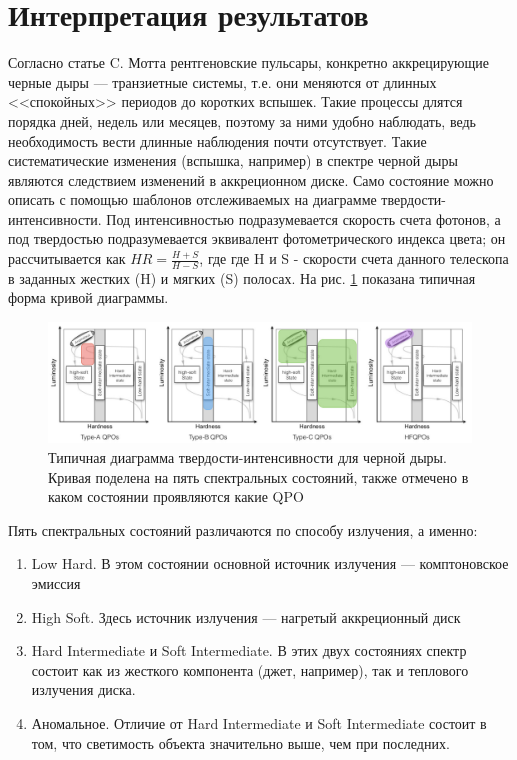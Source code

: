 \section{Интерпретация результатов}

	Согласно статье C. Мотта \cite{black_hole} рентгеновские пульсары, конкретно аккрецирующие черные дыры --- транзиетные системы, т.е. они меняются от длинных <<спокойных>> периодов до коротких вспышек. Такие процессы длятся порядка дней, недель или месяцев, поэтому за ними удобно наблюдать, ведь необходимость вести длинные наблюдения почти отсутствует. Такие систематические изменения (вспышка, например) в спектре черной дыры являются следствием  изменений в аккреционном диске. Само состояние можно описать с помощью шаблонов отслеживаемых на диаграмме твердости-интенсивности. Под интенсивностью подразумевается скорость счета фотонов, а под твердостью подразумевается эквивалент фотометрического индекса цвета; он рассчитывается как $HR = \frac{H + S}{H - S}$, где где H и S - скорости счета данного телескопа в заданных жестких (H) и мягких (S) полосах. На рис. \ref{img:sz} показана типичная форма кривой диаграммы.
	
	\begin{figure}[h!]
		\centering
		\includegraphics[width = \linewidth]{pictures/HID.png}
		\caption{Типичная диаграмма твердости-интенсивности для черной дыры. Кривая поделена на пять спектральных состояний, также отмечено в каком состоянии проявляются какие QPO}
		\label{img:sz}
	\end{figure}
	
	Пять спектральных состояний различаются по способу излучения, а именно:
	
	\begin{enumerate}
		\item 	Low Hard. В этом состоянии основной источник излучения --- комптоновское эмиссия
		\item High Soft. Здесь источник излучения --- нагретый аккреционный диск
		\item Hard Intermediate и Soft Intermediate. В этих двух состояниях спектр состоит как из жесткого компонента (джет, например), так и теплового излучения диска.
		\item Аномальное. Отличие от Hard Intermediate и Soft Intermediate состоит в том, что светимость объекта значительно выше, чем при последних. 
	\end{enumerate}
	
